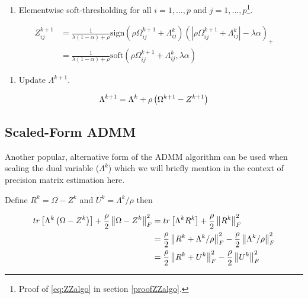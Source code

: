 \documentclass[11pt,]{report}
\providecommand{\tightlist}{%
  \setlength{\itemsep}{0pt}\setlength{\parskip}{0pt}}
\theoremstyle{definition}
\theoremstyle{definition}
\theoremstyle{definition}
\theoremstyle{remark}
\begin{document}
\begin{enumerate}
\def\labelenumi{\arabic{enumi}.}
\setcounter{enumi}{1}
\tightlist
\item
  Elementwise soft-thresholding for all \(i = 1,..., p\) and \(j = 1,..., p\)\footnote{Proof of \eqref{eq:ZZalgo} in section \ref{proofZZalgo}.}.
\end{enumerate}

\begin{equation}
\begin{split}
Z_{ij}^{k + 1} &= \frac{1}{\lambda(1 - \alpha) + \rho}\mbox{sign}\left(\rho\Omega_{ij}^{k + 1} + \Lambda_{ij}^{k}\right)\left( \left| \rho\Omega_{ij}^{k + 1} + \Lambda_{ij}^{k} \right| - \lambda\alpha \right)_{+} \\
&= \frac{1}{\lambda(1 - \alpha) + \rho}\mbox{soft}\left(\rho\Omega_{ij}^{k + 1} + \Lambda_{ij}^{k}, \lambda\alpha\right)
\end{split}
\label{eq:ZZalgo}
\end{equation}

\begin{enumerate}
\def\labelenumi{\arabic{enumi}.}
\setcounter{enumi}{2}
\tightlist
\item
  Update \(\Lambda^{k + 1}\).
\end{enumerate}

\begin{equation}
\Lambda^{k + 1} = \Lambda^{k} + \rho\left( \Omega^{k + 1} - Z^{k + 1} \right)
\label{eq:lamalgo}\notag
\end{equation}

\hypertarget{scaled-form-admm}{%
\subsection{Scaled-Form ADMM}\label{scaled-form-admm}}

Another popular, alternative form of the ADMM algorithm can be used when scaling the dual variable (\(\Lambda^{k}\)) which we will briefly mention in the context of precision matrix estimation here.

Define \(R^{k} = \Omega - Z^{k}\) and \(U^{k} = \Lambda^{k}/\rho\) then

\begin{equation}
\begin{split}
  tr\left[ \Lambda^{k}\left( \Omega - Z^{k} \right) \right] + \frac{\rho}{2}\left\| \Omega - Z^{k} \right\|_{F}^{2} &= tr\left[ \Lambda^{k}R^{k} \right] + \frac{\rho}{2}\left\| R^{k} \right\|_{F}^{2} \\
  &= \frac{\rho}{2}\left\| R^{k} + \Lambda^{k}/\rho \right\|_{F}^{2} - \frac{\rho}{2}\left\| \Lambda^{k}/\rho \right\|_{F}^{2} \\
  &= \frac{\rho}{2}\left\| R^{k} + U^{k} \right\|_{F}^{2} - \frac{\rho}{2}\left\| U^{k} \right\|_{F}^{2}
\end{split}
\label{eq:scaled}\notag
\end{equation}
\end{document}
